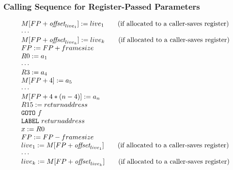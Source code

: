 \documentclass{beamer}
\begin{document}
\begin{frame}
\frametitle{Calling Sequence for Register-Passed Parameters}

\renewcommand{\arraystretch}{0.88}
\[\begin{array}{l}
M[FP+\mbox{\it offset}_{live_1}] := live_1  ~~~~~~\mbox{(if allocated to a
caller-saves register)} \\
\cdots \\
M[FP+\mbox{\it offset}_{live_k}] := live_k ~~~~~~\mbox{(if allocated to a
caller-saves register)} \\
FP := FP + framesize \\
R0 := a_1 \\
\cdots \\
R3 := a_4 \\
M[FP + 4] := a_5 \\
\cdots \\
M[FP + 4*(n-4)] := a_n \\
R15 := returnaddress \\
{\tt GOTO}~f \\
{\tt LABEL}~returnaddress \\
x := R0 \\
FP := FP - framesize \\
live_1 := M[FP+\mbox{\it offset}_{live_1}] ~~~~~~\mbox{(if allocated to a
caller-saves register)} \\
\cdots \\
live_k := M[FP+\mbox{\it offset}_{live_k}] ~~~~~~\mbox{(if allocated to a
caller-saves register)}
\end{array}\]

\end{frame}
\end{document}
